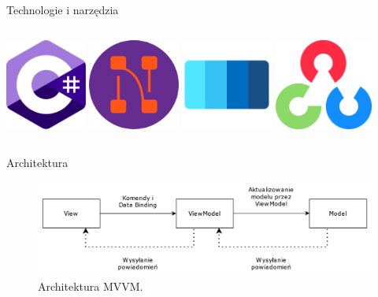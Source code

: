 \documentclass[aspectratio=1610,handout]{beamer}
\theoremstyle{definition}
\begin{document}
\begin{frame}{Technologie i narzędzia}
 \begin{columns}[t]
        \centering
        \includegraphics[height=3cm]{./imgs/csharp.png}
        \includegraphics[height=3cm]{./imgs/nodify.png}
        \centering
        \includegraphics[height=3cm]{./imgs/wpfui.png}
        \includegraphics[height=3cm]{./imgs/OpenCV.png}
    \end{columns}
\end{frame}

\begin{frame}{Architektura}
    \begin{figure}
            \includegraphics[width=\linewidth]{./imgs/diagram.png}%
            \caption{Architektura MVVM.}
    \end{figure}
\end{frame}
\end{document}
